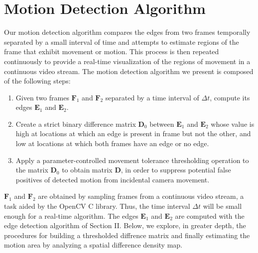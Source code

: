 \documentclass[journal]{IEEEtran}
\begin{document}
\section{Motion Detection Algorithm}
\label{motion-detection-section}
Our motion detection algorithm compares the edges from two frames temporally separated by a small interval of time and attempts to estimate regions of the frame that exhibit movement or motion. This process is then repeated continuously to provide a real-time visualization of the regions of movement in a continuous video stream. The motion detection algorithm we present is composed of the following steps:
\begin{enumerate}
	\item Given two frames $\boldsymbol{F}_1$ and $\boldsymbol{F}_2$ separated by a time interval of $\Delta t$, compute its edges $\boldsymbol{E}_1$ and $\boldsymbol{E}_2$.
	\item Create a strict binary difference matrix $\boldsymbol{D}_0$ between $\boldsymbol{E}_1$ and $\boldsymbol{E}_2$ whose value is high at locations at which an edge is present in frame but not the other, and low at locations at which both frames have an edge or no edge.
	\item Apply a parameter-controlled movement tolerance thresholding operation to the matrix $\boldsymbol{D}_0$ to obtain matrix $\boldsymbol{D}$, in order to suppress potential false positives of detected motion from incidental camera movement.
\end{enumerate}
\par $\boldsymbol{F}_1$ and $\boldsymbol{F}_2$ are obtained by sampling frames from a continuous video stream, a task aided by the OpenCV C library. Thus, the time interval $\Delta t$ will be small enough for a real-time algorithm. The edges $\boldsymbol{E}_1$ and $\boldsymbol{E}_2$ are computed with the edge detection algorithm of Section II. Below, we explore, in greater depth, the procedures for building a thresholded diffrence matrix and finally estimating the motion area by analyzing a spatial difference density map.
\end{document}
